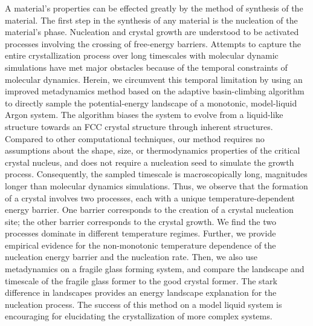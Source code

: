 A material's properties can be effected greatly by the method of synthesis of the material.  The first step in the synthesis of any material is the nucleation of the material's phase.  Nucleation and crystal growth are understood to be activated processes involving the crossing of free-energy barriers. Attempts to capture the entire crystallization process over long timescales with molecular dynamic simulations have met major obstacles because of the temporal constraints of molecular dynamics. Herein, we circumvent this temporal limitation by using an improved metadynamics method based on the adaptive basin-climbing algorithm to directly sample the potential-energy landscape of a monotonic, model-liquid Argon system. The algorithm biases the system to evolve from a liquid-like structure towards an FCC crystal structure through inherent structures.  Compared to other computational techniques, our method requires no assumptions about the shape, size, or thermodynamics properties of the critical crystal nucleus, and does not require a nucleation seed to simulate the growth process.  Consequently, the sampled timescale is macroscopically long, magnitudes longer than molecular dynamics simulations.  Thus, we observe that the formation of a crystal involves two processes, each with a unique temperature-dependent energy barrier. One barrier corresponds to the creation of a crystal nucleation site; the other barrier corresponds to the crystal growth. We find the two processes dominate in different temperature regimes.  Further, we provide empirical evidence for the non-monotonic temperature dependence of the nucleation energy barrier and the nucleation rate.  Then, we also use metadynamics on a fragile glass forming system, and compare the landscape and timescale of the fragile glass former to the good crystal former.  The stark difference in landscapes provides an energy landscape explanation for the nucleation process.  The success of this method on a model liquid system is encouraging for elucidating the crystallization of more complex systems. 